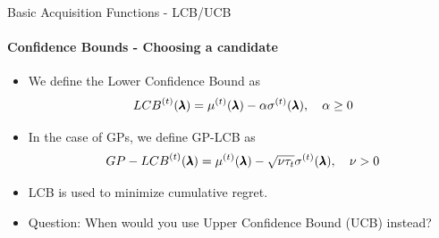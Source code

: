 \begin{frame}[c]{Basic Acquisition Functions - LCB/UCB}
\framesubtitle{Confidence Bounds - Choosing a candidate}
\begin{itemize}
    \item<+->{We define the Lower Confidence Bound as 
    \[{LCB}^{(t)}(\pmb{\lambda}) = {\mu}^{(t)}(\pmb{\lambda}) - \alpha{\sigma}^{(t)}(\pmb{\lambda}),\quad\alpha\geq0\]}
    \item<+->{In the case of GPs, we define GP-LCB as
    \[{GP-LCB}^{(t)}(\pmb{\lambda}) = {\mu}^{(t)}(\pmb{\lambda}) - \sqrt{\nu\tau_t}{\sigma}^{(t)}(\pmb{\lambda}), \quad\nu>0\]}
    \item<+->{LCB is used to minimize cumulative regret.} 
    \item<+->{Question: When would you use Upper Confidence Bound (UCB) instead?}
\end{itemize}
\end{frame}
